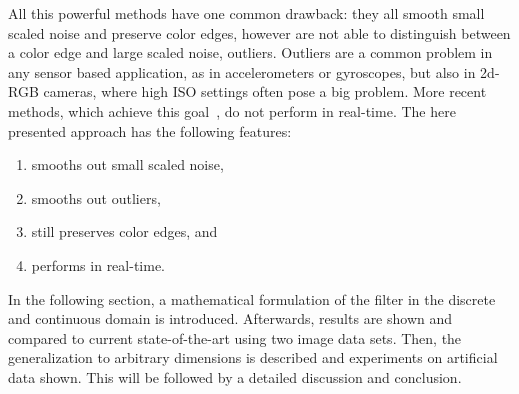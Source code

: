 All this powerful methods have one common drawback: they all smooth small scaled noise and preserve color edges, however are not able to distinguish between a color edge and large scaled noise, \eg outliers. 
Outliers are a common problem in any sensor based application, as in accelerometers or gyroscopes, but also in 2d-RGB cameras, where high ISO settings often pose a big problem. 
More recent methods, which achieve this goal~\cite{dabov2007image,zoran2011learning,mairal2009non}, do not perform in real-time.
The here presented approach has the following features:

\begin{enumerate}
  \item smooths out small scaled noise,
  \item smooths out outliers,
  \item still preserves color edges, and
  \item performs in real-time.
\end{enumerate}

In the following section, a mathematical formulation of the filter in the discrete and continuous domain is introduced. 
Afterwards, results are shown and compared to current state-of-the-art using two image data sets.
Then, the generalization to arbitrary dimensions is described and experiments on artificial data shown.
This will be followed by a detailed discussion and conclusion.
